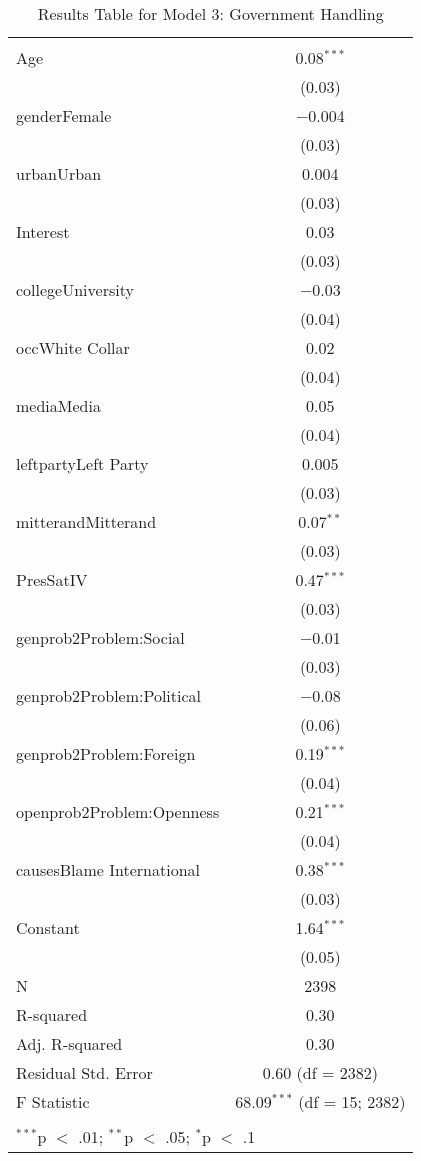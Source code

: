 
\begin{table}[!htbp] \centering 
  \caption{Results Table for Model 3: Government Handling} 
  \label{} 
\footnotesize 
\begin{tabular}{@{\extracolsep{5pt}}lc} 
\\[-1.8ex]\hline \\[-1.8ex] 
\hline \\[-1.8ex] 
 Age & 0.08$^{***}$ \\ 
  & (0.03) \\ 
  genderFemale & $-$0.004 \\ 
  & (0.03) \\ 
  urbanUrban & 0.004 \\ 
  & (0.03) \\ 
  Interest & 0.03 \\ 
  & (0.03) \\ 
  collegeUniversity & $-$0.03 \\ 
  & (0.04) \\ 
  occWhite Collar & 0.02 \\ 
  & (0.04) \\ 
  mediaMedia & 0.05 \\ 
  & (0.04) \\ 
  leftpartyLeft Party & 0.005 \\ 
  & (0.03) \\ 
  mitterandMitterand & 0.07$^{**}$ \\ 
  & (0.03) \\ 
  PresSatIV & 0.47$^{***}$ \\ 
  & (0.03) \\ 
  genprob2Problem:Social & $-$0.01 \\ 
  & (0.03) \\ 
  genprob2Problem:Political & $-$0.08 \\ 
  & (0.06) \\ 
  genprob2Problem:Foreign & 0.19$^{***}$ \\ 
  & (0.04) \\ 
  openprob2Problem:Openness & 0.21$^{***}$ \\ 
  & (0.04) \\ 
  causesBlame International & 0.38$^{***}$ \\ 
  & (0.03) \\ 
  Constant & 1.64$^{***}$ \\ 
  & (0.05) \\ 
 N & 2398 \\ 
R-squared & 0.30 \\ 
Adj. R-squared & 0.30 \\ 
Residual Std. Error & 0.60 (df = 2382) \\ 
F Statistic & 68.09$^{***}$ (df = 15; 2382) \\ 
\hline \\[-1.8ex] 
\multicolumn{2}{l}{$^{***}$p $<$ .01; $^{**}$p $<$ .05; $^{*}$p $<$ .1} \\ 
\end{tabular} 
\end{table} 
